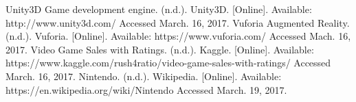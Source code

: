 

%
%

\begin{thebibliography}{1}
  Unity3D Game development engine. (n.d.). Unity3D. [Online]. Available:
  http://www.unity3d.com/
  Accessed March. 16, 2017.
  Vuforia Augmented Reality. (n.d.). Vuforia. [Online]. Available:
  https://www.vuforia.com/
  Accessed Mach. 16, 2017.
  Video Game Sales with Ratings. (n.d.). Kaggle. [Online]. Available:
  https://www.kaggle.com/rush4ratio/video-game-sales-with-ratings/
  Accessed March. 16, 2017.
  Nintendo. (n.d.). Wikipedia. [Online]. Available:
  https://en.wikipedia.org/wiki/Nintendo
  Accessed March. 19, 2017.
\end{thebibliography}
